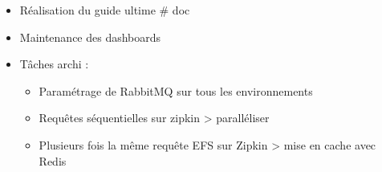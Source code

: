 \begin{itemize}
	\item Réalisation du guide ultime \# doc
	\item Maintenance des dashboards
	\item Tâches archi :
		\begin{itemize}
			\item Paramétrage de RabbitMQ sur tous les environnements
			\item Requêtes séquentielles sur zipkin > paralléliser
			\item Plusieurs fois la même requête EFS sur Zipkin > mise en cache avec Redis
		\end{itemize}
\end{itemize}